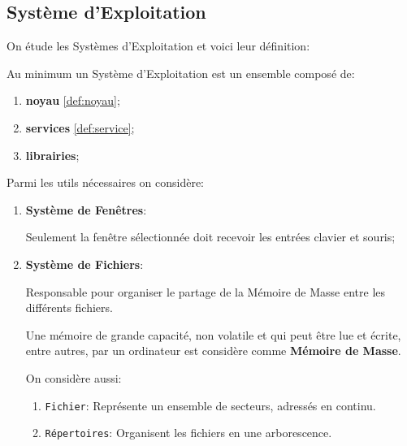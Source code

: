 \documentclass{article}
\begin{document}
\subsection{Système d'Exploitation}
On étude les Systèmes d'Exploitation et voici leur définition:
\begin{definition}\label{def:systemeExploitation}
    Au minimum un Système d'Exploitation est un ensemble composé de:
    \begin{enumerate}[noitemsep]
        \item \textbf{noyau} \ref{def:noyau};
        \item \textbf{services} \ref{def:service};
        \item \textbf{librairies};
    \end{enumerate}
\end{definition}
Parmi les utils nécessaires on considère:
\begin{enumerate}[rightmargin=\leftmargin]
    \item \textbf{Système de Fenêtres}: 
    \begin{definition}
        Seulement la fenêtre sélectionnée doit recevoir les entrées clavier et souris;
    \end{definition}
    
    \item \textbf{Système de Fichiers}: 
    \begin{definition}
        Responsable pour organiser le partage de la Mémoire de Masse entre les différents fichiers.        
    \end{definition}

    \begin{remark}
        Une mémoire de grande capacité, non volatile et qui peut être lue et écrite, entre autres, par un ordinateur est considère comme \textbf{Mémoire de Masse}.
    \end{remark}
    On considère aussi:
    \begin{enumerate}[noitemsep, rightmargin=\leftmargin]
        \item \texttt{Fichier}: Représente un ensemble de secteurs, adressés en continu. 

        \item \texttt{Répertoires}: Organisent les fichiers en une arborescence.
    \end{enumerate}
\end{enumerate}
\end{document}
